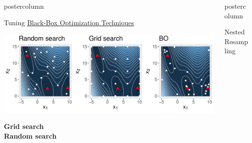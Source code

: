 \documentclass{beamer}
\newlength{\columnheight} %
\begin{document}
\begin{frame}[fragile]{}
\begin{columns}
\begin{column}{.31\textwidth}
\begin{beamercolorbox}[center]{postercolumn}
\begin{minipage}{.98\textwidth}
{\begin{myblock}{Tuning}
\underline{Black-Box Optimization Techniques}\\

 \begin{center}
             \includegraphics[width=0.95\columnwidth]{figure/bb_cmp.pdf}
               \end{center}

\textbf{Grid search}\\ 

\textbf{Random search}
\end{myblock}



				}
			\end{minipage}
		\end{beamercolorbox}
	\end{column}
	\begin{column}{.31\textwidth}
		\begin{beamercolorbox}[center]{postercolumn}
			\begin{minipage}{.98\textwidth}
				\parbox[t][\columnheight]{\textwidth}{


\begin{myblock}{Nested Resampling}

\end{myblock}

			  }
			\end{minipage}
		\end{beamercolorbox}
	\end{column}
\end{columns}

\end{frame}
\end{document}
